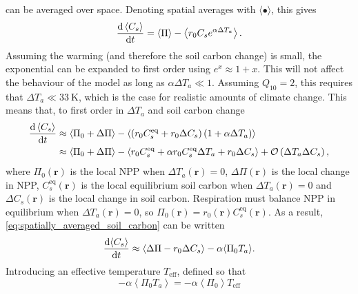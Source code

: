  can be averaged over space. Denoting spatial averages with $\langle \bullet \rangle$, this gives
\begin{equation}
  \label{eq:spatially_averaged_soil_carbon}
  \dv{\left\langle C_s\right\rangle}{t} = \left\langle \Pi \right \rangle - \left\langle r_0 C_s e^{\alpha \Delta T_a} \right \rangle.
\end{equation}
Assuming the warming (and therefore the soil carbon change) is small, the exponential can be expanded to first order using $e^x \approx 1 + x$. This will not affect the behaviour of the model
as long as $\alpha \Delta T_a \ll 1$. Assuming $Q_{10} = 2$, this requires that $\Delta T_a \ll \SI{33}{\kelvin}$, which is the case for realistic amounts of climate change.
This means that, to first order in $\Delta T_a$ and soil carbon change
\begin{align*}
  \dv{\left\langle C_s\right\rangle}{t} &\approx \left \langle \Pi_0 + \Delta \Pi\right\rangle - \left \langle \left(r_0C_s^{\mathrm{eq}} + r_0\Delta C_s\right)\left(1 + \alpha \Delta T_a\right)\right\rangle \\
                                        &\approx \left \langle \Pi_0 + \Delta \Pi\right\rangle -\left\langle r_0C_s^{\mathrm{eq}} + \alpha r_0C_s^{\mathrm{eq}} \Delta T_a + r_0 \Delta C_s \right \rangle
                                          + \mathcal{O}\left(\Delta T_a \Delta C_s\right),
\end{align*}
where $\Pi_0\left(\bm{r}\right)$ is the local NPP when $\Delta T_a\left(\bm{r}\right) = 0$, $\Delta \Pi\left(\bm{r}\right)$ is the local change in NPP, $C_s^{\mathrm{eq}}\left(\bm{r}\right)$
is the local equilibrium soil carbon when $\Delta T_a\left(\bm{r}\right) = 0$ and
$\Delta C_s\left(\bm{r}\right)$ is the local change in soil carbon.
Respiration must balance NPP in equilibrium when $\Delta T_a\left(\bm{r}\right) = 0$, so $\Pi_0\left(\bm{r}\right)  = r_0\left(\bm{r}\right) C_s^{\mathrm{eq}}\left(\bm{r}\right) $.
As a result, \cref{eq:spatially_averaged_soil_carbon} can be written
\begin{equation}
  \label{eq:soil_carbon_linearised}
  \dv{\langle C_s\rangle}{t} \approx \left\langle \Delta \Pi - r_0 \Delta C_s \right\rangle-\alpha \langle \Pi_0 T_a \rangle.
\end{equation}
Introducing an effective temperature $T_{\mathrm{eff}}$, defined so that
\begin{equation}
  \label{eq:motivation_of_effective_temperature}
  - \alpha \left \langle \Pi_0 T_a \right\rangle = - \alpha \left \langle \Pi_0 \right\rangle T_{\mathrm{eff}}
\end{equation}
